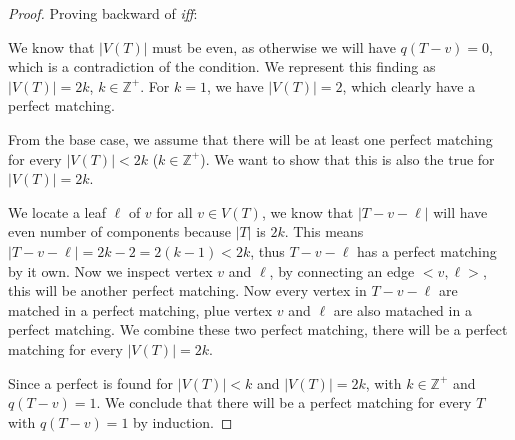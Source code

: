 \documentclass[11pt]{article}
\begin{document}
\begin{proof}
Proving backward of \textit{iff}:

We know that $|V(T)|$ must be even, as otherwise we will have $q(T-v) = 0$, which is a contradiction of the condition. We represent this finding as $|V(T)| = 2k$, $k \in \mathbb{Z}^+$. For $k = 1$, we have $|V(T)| = 2$, which clearly have a perfect matching.\newline

From the base case, we assume that there will be at least one perfect matching for every $|V(T)| < 2k$ ($k \in \mathbb{Z}^+$). We want to show that this is also the true for $|V(T)| = 2k$.

We locate a leaf $\ell$ of $v$ for all $v \in V(T)$, we know that $|T - v - \ell|$ will have even number of components because $|T|$ is $2k$. This means $|T - v - \ell| = 2k - 2 = 2(k-1) < 2k$, thus $T - v - \ell$ has a perfect matching by it own. Now we inspect vertex $v$ and $\ell$, by connecting an edge $<v, \ell>$, this will be another perfect matching. Now every vertex in $T - v - \ell$ are matched in a perfect matching, plue vertex $v$ and $\ell$ are also matached in a perfect matching. We combine these two perfect matching, there will be a perfect matching for every $|V(T)| = 2k$.

Since a perfect is found for $|V(T)| < k$ and $|V(T)| = 2k$, with $k \in \mathbb{Z}^+$ and $q(T-v) = 1$. We conclude that there will be a perfect matching for every $T$ with $q(T-v) = 1$ by induction.

\end{proof}



%
% 
% 
\end{document}
